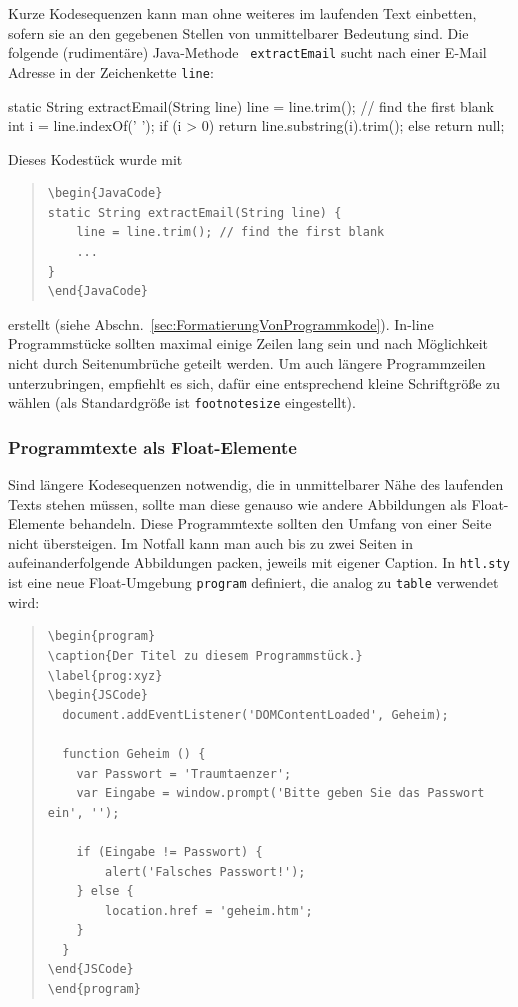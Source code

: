 Kurze Kodesequenzen kann man ohne weiteres im laufenden Text
einbetten, sofern sie an den gegebenen Stellen von unmittelbarer
Bedeutung sind. Die folgende (rudimentäre) Java-Methode {\tt
extractEmail} sucht nach einer E-Mail Adresse in der Zeichenkette
\texttt{line}:

\medskip
\begin{JavaCode}
static String extractEmail(String line) {
    line = line.trim(); // find the first blank
    int i = line.indexOf(' '); 
    if (i > 0)
        return line.substring(i).trim();
    else
        return null;
}
\end{JavaCode}
\medskip

\noindent
Dieses Kodestück wurde mit 
\begin{quote}
\begin{verbatim}
\begin{JavaCode}
static String extractEmail(String line) {
    line = line.trim(); // find the first blank
    ...
}
\end{JavaCode}
\end{verbatim}
\end{quote}
erstellt (siehe Abschn.\ \ref{sec:FormatierungVonProgrammkode}). In-line Programmstücke sollten maximal einige Zeilen lang sein und nach Möglichkeit nicht durch Seitenumbrüche geteilt werden.
Um auch längere Programmzeilen unterzubringen, empfiehlt es sich, dafür
eine entsprechend kleine Schriftgröße zu wählen (als Standardgröße ist
\texttt{footnotesize} eingestellt). 



\subsubsection{Programmtexte als Float-Elemente}
Sind längere Kodesequenzen notwendig, die in unmittelbarer Nähe des laufenden Texts
stehen müssen, sollte man diese genauso wie andere Abbildungen als Float-Elemente
behandeln. Diese Programmtexte sollten den Umfang von einer Seite nicht übersteigen.
Im Notfall kann man auch bis zu zwei Seiten in aufeinanderfolgende Abbildungen packen,
jeweils mit eigener Caption. In \texttt{htl.sty} ist eine neue Float-Umgebung
\texttt{program} definiert, die analog zu \texttt{table} verwendet wird:
%
\begin{quote}
\begin{verbatim}
\begin{program}
\caption{Der Titel zu diesem Programmstück.}
\label{prog:xyz}
\begin{JSCode}
  document.addEventListener('DOMContentLoaded', Geheim);

  function Geheim () {
    var Passwort = 'Traumtaenzer';
    var Eingabe = window.prompt('Bitte geben Sie das Passwort ein', '');

    if (Eingabe != Passwort) {
        alert('Falsches Passwort!');
    } else {
        location.href = 'geheim.htm';
    }
  }
\end{JSCode}
\end{program}
\end{verbatim}
\end{quote}


